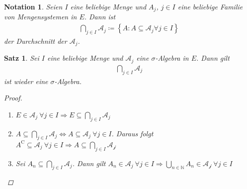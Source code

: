\documentclass[11pt, twoside, a4paper]{article}
\theoremstyle{plain}
\newtheorem{satz}[blockelement]{Satz}
\newtheorem{notation}[blockelement]{Notation}
\numberwithin{equation}{subsection}
\newcommand{\set}[1]{\left\{#1\right\}}
\newcommand{\equivalent}[0]{\Leftrightarrow{}}
\newcommand{\impl}[0]{\Rightarrow{}}
\newcommand{\comp}[1]{{#1}^{\mathrm{C}}}
\newcommand{\theoremescape}{\leavevmode}
\newcommand{\N}{\mathbb{N}}
\begin{document}
    \begin{notation}
        Seien $I$ eine beliebige Menge und $A_j$, $j\in I$ eine beliebige Familie von Mengensystemen in $E$. Dann ist
        \begin{align*}
            \bigcap_{j\in I} \mathcal{A}_j \coloneqq \set{A: A \subseteq \mathcal{A}_j \forall j\in I}
        \end{align*}
        der Durchschnitt der $\mathcal{A}_j$.
    \end{notation}

    \begin{satz} %
        \label{satz:schnitt-sig-algebra}
        Sei $I$ eine beliebige Menge und $\mathcal{A}_j$ eine $\sigma$-Algebra in $E$. Dann gilt
        \begin{align*}
            \bigcap_{j\in I} \mathcal{A}_j
        \end{align*}
        ist wieder eine $\sigma$-Algebra.
        \begin{proof}
            \theoremescape
            \begin{enumerate}[label=(\roman*)]
                \item $E\in\mathcal{A}_j~\forall j\in I \impl E \subseteq \bigcap_{j\in I} \mathcal{A}_j$
                \item $A \subseteq \bigcap_{j\in I} \mathcal{A}_j \equivalent A \subseteq \mathcal{A}_j~\forall j\in I$. Daraus folgt $\comp{A} \subseteq \mathcal{A}_j~\forall j\in I \impl A \subseteq \bigcap_{j\in I}\mathcal{A_j}$
                \item Sei $A_n \subseteq \bigcap_{j\in I} \mathcal{A}_j$. Dann gilt $A_n \in \mathcal{A}_j~\forall j\in I \impl \bigcup_{n\in\N} A_n \in \mathcal{A_j}~\forall j\in I$
            \end{enumerate}
        \end{proof}
    \end{satz}
\end{document}
